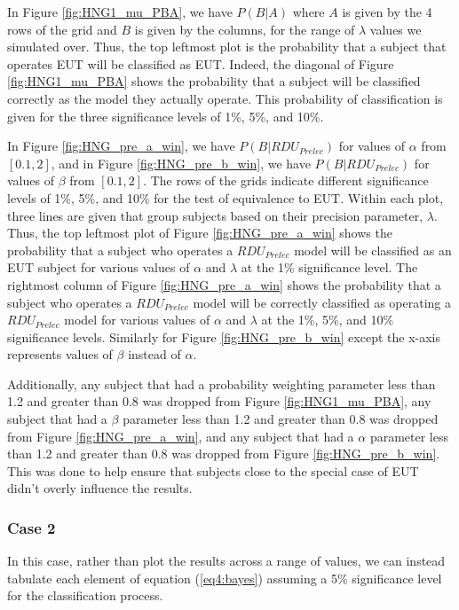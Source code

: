 \documentclass[../main.tex]{subfiles}
\begin{document}
In Figure \ref{fig:HNG1_mu_PBA}, we have $P(B|A)$ where $A$ is given by the 4 rows of the grid and $B$ is given by the columns, for the range of $\lambda$ values we simulated over.
Thus, the top leftmost plot is the probability that a subject that operates EUT will be classified as EUT.
Indeed, the diagonal of Figure \ref{fig:HNG1_mu_PBA} shows the probability that a subject will be classified correctly as the model they actually operate.
This probability of classification is given for the three significance levels of 1\%, 5\%, and 10\%.

In Figure \ref{fig:HNG_pre_a_win}, we have $P(B|\mathit{RDU_{Prelec}})$ for values of $\alpha$ from $[0.1, 2]$, and in Figure \ref{fig:HNG_pre_b_win}, we have $P(B|\mathit{RDU_{Prelec}})$ for values of $\beta$ from $[0.1, 2]$.
The rows of the grids indicate different significance levels of 1\%, 5\%, and 10\% for the test of equivalence to EUT.
Within each plot, three lines are given that group subjects based on their precision parameter, $\lambda$.
Thus, the top leftmost plot of Figure \ref{fig:HNG_pre_a_win} shows the probability that a subject who operates a $\mathit{RDU_{Prelec}}$ model will be classified as an EUT subject for various values of $\alpha$ and $\lambda$ at the 1\% significance level.
The rightmost column of Figure \ref{fig:HNG_pre_a_win} shows the probability that a subject who operates a $\mathit{RDU_{Prelec}}$ model will be correctly classified as operating a $\mathit{RDU_{Prelec}}$ model for various values of $\alpha$ and $\lambda$ at the 1\%, 5\%, and 10\% significance levels.
Similarly for Figure \ref{fig:HNG_pre_b_win} except the x-axis represents values of $\beta$ instead of $\alpha$.

Additionally, any subject that had a probability weighting parameter less than 1.2 and greater than 0.8 was dropped from Figure \ref{fig:HNG1_mu_PBA}, any subject that had a $\beta$ parameter less than 1.2 and greater than 0.8 was dropped from Figure \ref{fig:HNG_pre_a_win}, and any subject that had a $\alpha$ parameter less than 1.2 and greater than 0.8 was dropped from Figure \ref{fig:HNG_pre_b_win}.
This was done to help ensure that subjects close to the special case of EUT didn't overly influence the results.

\subsubsection{Case 2}

In this case, rather than plot the results across a range of values, we can instead tabulate each element of equation (\ref{eq4:bayes}) assuming a 5\% significance level for the classification process.
\end{document}
